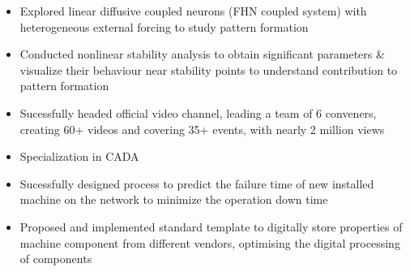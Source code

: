 \documentclass[10pt,a4paper,ragged2e,withhyper]{altacv}
\begin{document}
\begin{paracol}{2}
\begin{itemize}
\item Explored linear diffusive coupled neurons (FHN coupled system) with heterogeneous external forcing to study pattern formation
\item Conducted nonlinear stability analysis to obtain significant parameters \& visualize their behaviour near stability points to understand contribution to pattern formation
\end{itemize}


\label{sec:org79cfc75}
\begin{itemize}
\item Sucessfully headed official video channel, leading a team of 6 conveners, creating 60+ videos and covering 35+ events, with nearly 2 million views
\end{itemize}



\newpage

\switchcolumn

\label{sec:orgb5d6f0c}

\divider


\divider


\label{sec:org0764d43}
\begin{itemize}
\item Specialization in CADA
\item Sucessfully designed process to predict the failure time of new installed machine on the network to minimize the operation down time
\item Proposed and implemented standard template to digitally store properties of machine component from different vendors, optimising the digital processing of components
\end{itemize}

\divider


\end{paracol}
\end{document}
